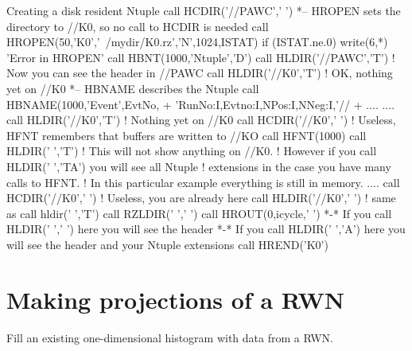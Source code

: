 \begin{XMPt}{Creating a disk resident Ntuple}
      call HCDIR('//PAWC',' ')
*--     HROPEN sets the directory to //K0, so no call to HCDIR is needed
      call HROPEN(50,'K0','~/mydir/K0.rz','N',1024,ISTAT)
      if (ISTAT.ne.0) write(6,*) 'Error in HROPEN'
      call HBNT(1000,'Ntuple','D')
      call HLDIR('//PAWC','T') ! Now you can see the header in //PAWC
      call HLDIR('//K0','T')   ! OK, nothing yet on //K0
*--     HBNAME describes the Ntuple
      call HBNAME(1000,'Event',EvtNo,
     +            'RunNo:I,Evtno:I,NPos:I,NNeg:I,'//
     +            ....
....
        call HLDIR('//K0','T') ! Nothing yet on //K0
        call HCDIR('//K0',' ') ! Useless, HFNT remembers that buffers are
 written to //KO
        call HFNT(1000)
        call HLDIR(' ','T')    ! This will not show anything on //K0.
                               ! However if you call HLDIR(' ','TA') you will
 see all Ntuple
                               ! extensions in the case you have many calls to
 HFNT.
                               ! In this particular example everything is still
 in memory.
....
      call HCDIR('//K0',' ')   ! Useless, you are already here
      call HLDIR('//K0',' ')   ! same as call hldir(' ','T')
      call RZLDIR(' ',' ')
      call HROUT(0,icycle,' ')
*-*      If you call HLDIR(' ',' ') here you will see the header
*-*      If you call HLDIR(' ','A') here you will see the header and your Ntuple
 extensions
      call HREND('K0')
\end{XMPt}

\finalnewpage%

\section{Making projections of a RWN}
\label{HNTUPROJ}


\Action
Fill an existing one-dimensional histogram with data from a RWN.

